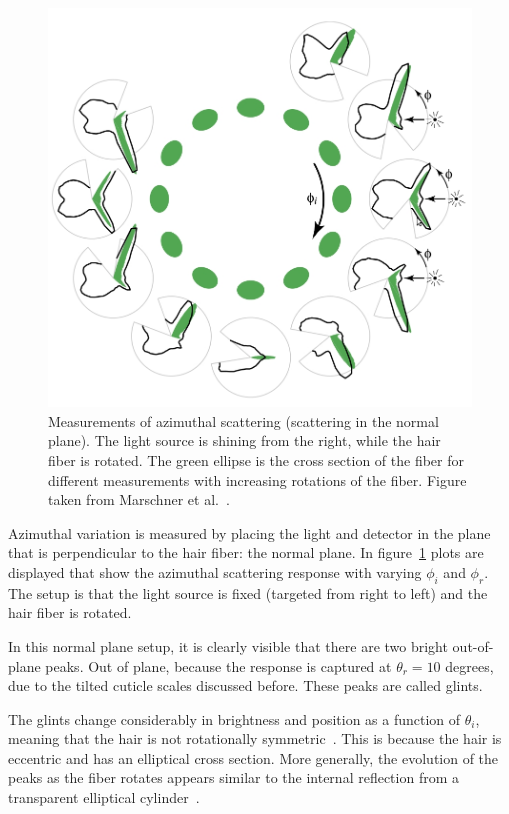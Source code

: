 \documentclass[11pt,a4paper]{report}
\begin{document}
\begin{figure}[h]
\begin{center}
\includegraphics[scale=0.4]{images/azimuthal_measurement.jpeg}
\caption{Measurements of azimuthal scattering (scattering in the normal plane). The light source is shining from the right, while the hair fiber is rotated. The green ellipse is the cross section of the fiber for different measurements with increasing rotations of the fiber. Figure taken from Marschner et al.~\cite{marschner}.}
\label{fig_azimuthal_marschner}
\end{center}
\end{figure}


Azimuthal variation is measured by placing the light and detector in the plane that is perpendicular to the hair fiber: the normal plane. In figure~\ref{fig_azimuthal_marschner} plots are displayed that show the azimuthal scattering response with varying $\phi_i$ and $\phi_r$. The setup is that the light source is fixed (targeted from right to left) and the hair fiber is rotated. 

In this normal plane setup, it is clearly visible that there are two bright out-of-plane peaks. Out of plane, because the response is captured at $\theta_r = 10$ degrees, due to the tilted cuticle scales discussed before. These peaks are called glints.

The glints change considerably in brightness and position as a function of $\theta_i$,  meaning that the hair is not rotationally symmetric~\cite{marschner}. This is because the hair is eccentric and has an elliptical cross section. More generally, the evolution of the peaks as the fiber rotates appears similar to the internal reflection from a transparent elliptical cylinder~\cite{marschner}.
\end{document}
